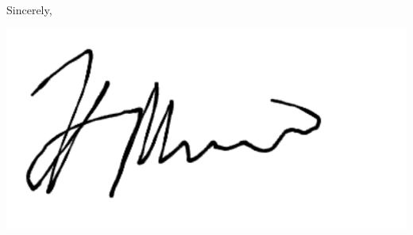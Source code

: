 \documentclass{wkrpt}
\begin{document}
Sincerely,

\includegraphics[height=5\baselineskip]{assets/signature} \par
\printauthorname\\
\printstudentnumber


\tableofcontents


\listoffigures


\listoftables

\end{document}
